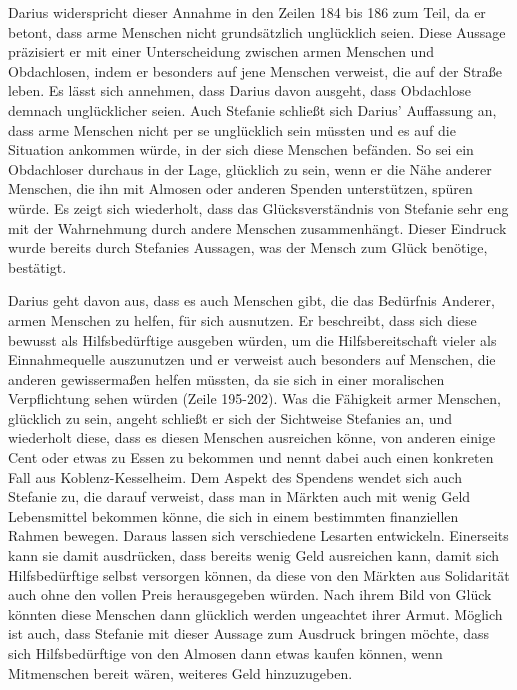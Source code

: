 Darius widerspricht dieser Annahme in den Zeilen 184 bis 186 zum Teil, da er betont, dass arme Menschen nicht grundsätzlich unglücklich seien. 
Diese Aussage präzisiert er mit einer Unterscheidung zwischen armen Menschen und Obdachlosen, indem er besonders auf jene Menschen verweist, die auf der Straße leben.
Es lässt sich annehmen, dass Darius davon ausgeht, dass Obdachlose demnach unglücklicher seien. 
Auch Stefanie schließt sich Darius' Auffassung an, dass arme Menschen nicht per se unglücklich sein müssten und es auf die Situation ankommen würde, in der sich diese Menschen befänden. 
So sei ein Obdachloser durchaus in der Lage, glücklich zu sein, wenn er die Nähe anderer Menschen, die ihn mit Almosen oder anderen Spenden unterstützen, spüren würde. 
Es zeigt sich wiederholt, dass das Glücksverständnis von Stefanie sehr eng mit der Wahrnehmung durch andere Menschen zusammenhängt. 
Dieser Eindruck wurde bereits durch Stefanies Aussagen, was der Mensch zum Glück benötige, bestätigt.

Darius geht davon aus, dass es auch Menschen gibt, die das Bedürfnis Anderer, armen Menschen zu helfen, für sich ausnutzen. 
Er beschreibt, dass sich diese bewusst als Hilfsbedürftige ausgeben würden, um die Hilfsbereitschaft vieler als Einnahmequelle auszunutzen und er verweist auch besonders auf Menschen, die anderen gewissermaßen helfen müssten, da sie sich in einer moralischen Verpflichtung sehen würden (Zeile 195-202). 
Was die Fähigkeit armer Menschen, glücklich zu sein, angeht schließt er sich der Sichtweise Stefanies an, und wiederholt diese, dass es diesen Menschen ausreichen könne, von anderen einige Cent oder etwas zu Essen zu bekommen und nennt dabei auch einen konkreten Fall aus Koblenz-Kesselheim. 
Dem Aspekt des Spendens wendet sich auch Stefanie zu, die darauf verweist, dass man in Märkten auch mit wenig Geld Lebensmittel bekommen könne, die sich in einem bestimmten finanziellen Rahmen bewegen. 
Daraus lassen sich verschiedene Lesarten entwickeln. 
Einerseits kann sie damit ausdrücken, dass bereits wenig Geld ausreichen kann, damit sich Hilfsbedürftige selbst versorgen können, da diese von den Märkten aus Solidarität auch ohne den vollen Preis herausgegeben würden. 
Nach ihrem Bild von Glück könnten diese Menschen dann glücklich werden ungeachtet ihrer Armut. 
Möglich ist auch, dass Stefanie mit dieser Aussage zum Ausdruck bringen möchte, dass sich Hilfsbedürftige von den Almosen dann etwas kaufen können, wenn Mitmenschen bereit wären, weiteres Geld hinzuzugeben. 

